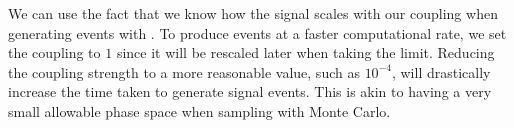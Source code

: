 We can use the fact that we know how the signal scales with our coupling when generating events with \madgraph.
To produce events at a faster computational rate, we set the coupling to $1$ since it will be rescaled later when taking the limit.
Reducing the coupling strength to a more reasonable value, such as $10^{-4}$, will drastically increase the time taken to generate signal events.
This is akin to having a very small allowable phase space when sampling with Monte Carlo.

